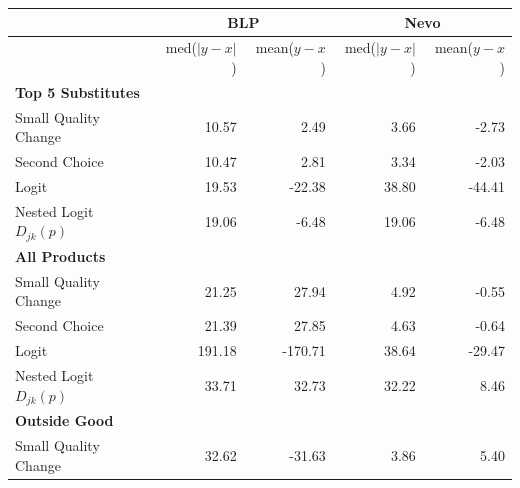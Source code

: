 \begin{tabular}{lrrrr}
\midrule
                                                                &   \multicolumn{2}{c|}{\textbf{BLP}} & \multicolumn{2}{c}{\textbf{Nevo}} \\ \midrule & med($|y-x|$) &   mean($y-x$)  &   med($|y-x|$) &   mean($y-x$) \\
\midrule
 \midrule \bf Top 5 Substitutes && \\ \midrule Small Quality Change &                                                                                            10.57 &           2.49 &           3.66 &         -2.73 \\
 Second Choice                                                  &                                                                                            10.47 &           2.81 &           3.34 &         -2.03 \\
 Logit                                                          &                                                                                            19.53 &         -22.38 &          38.80 &        -44.41 \\
 Nested Logit $ D_{jk}(p) $                                     &                                                                                            19.06 &          -6.48 &          19.06 &         -6.48 \\
 \midrule \bf All Products&& \\ \midrule Small Quality Change       &                                                                                            21.25 &          27.94 &           4.92 &         -0.55 \\
 Second Choice                                                  &                                                                                            21.39 &          27.85 &           4.63 &         -0.64 \\
 Logit                                                          &                                                                                           191.18 &        -170.71 &          38.64 &        -29.47 \\
 Nested Logit $ D_{jk}(p) $                                     &                                                                                            33.71 &          32.73 &          32.22 &          8.46 \\
 \midrule \bf Outside Good&& \\ \midrule Small Quality Change       &                                                                                            32.62 &         -31.63 &           3.86 &          5.40 \\

\end{tabular}
